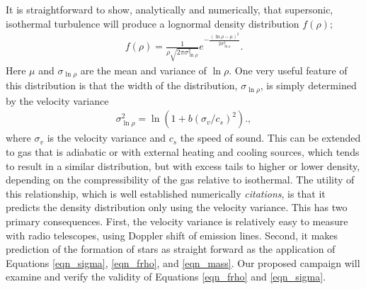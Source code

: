 It is straightforward to show, analytically and numerically, that supersonic,
isothermal turbulence will produce a lognormal density distribution
$f(\rho)$;
\begin{align}
f(\rho) = \frac{1}{\rho \sqrt{2 \pi \sigma_{\ln \rho}^2}} e^{-\frac{(\ln \rho-\mu)^2}{2
\sigma_{\ln \rho}^2}}.\label{eqn_frho}
\end{align}
Here $\mu$  and $\sigma_{\ln \rho}$ are the mean and variance of $\ln \rho$. One very useful feature of this distribution is that the width of
the distribution, $\sigma_{\ln \rho}$, is simply determined by the velocity variance
\begin{align}
\sigma_{\ln \rho}^2 = \ln\left( 1 + b (\sigma_v/c_s)^2\right).\label{eqn_sigma},
\end{align}
where $\sigma_v$ is the velocity variance and $c_s$ the speed of sound.
This can be extended to gas that is adiabatic or with external heating and
cooling sources, which tends to result in a similar distribution, but with excess
tails to higher or lower density, depending on the compressibility of the gas
relative to isothermal.  The utility of this relationship, which is well
established numerically \emph{citations}, is that it predicts the density
distribution only using the velocity variance.  This has two primary
consequences.  First, the velocity variance is relatively easy to measure with
radio telescopes, using Doppler shift of emission lines.  Second, it makes
prediction of the formation of stars as straight forward as the application of
Equations \ref{eqn_sigma}, \ref{eqn_frho}, and \ref{eqn_mass}.  
Our proposed campaign will examine and verify the validity of  Equations
\ref{eqn_frho} and \ref{eqn_sigma}.
%
